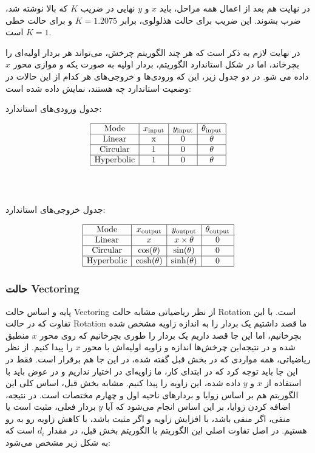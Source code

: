 \documentclass[12pt,titlepage,a4page , tikz , multi,table , svgnames,xcdraw]{article}
\begin{document}
در نهایت هم بعد از اعمال همه مراحل، باید $x$ و $y$ نهایی در ضریب $K$ که بالا نوشته شد، ضرب بشوند. این ضریب برای حالت هذلولوی، برابر $K = 1.2075$ و برای حالت خطی $K=1$ است.

در نهایت لازم به ذکر است که هر چند الگوریتم چرخش، می‌تواند هر بردار اولیه‌ای را بچرخاند، اما در شکل استاندارد الگوریتم، بردار اولیه به صورت یکه و موازی محور $x$ داده می شو. در دو جدول زیر، این که ورودی‌ها و خروجی‌های هر کدام از این حالات در وضعیت استاندارد چه هستند، نمایش داده شده است:

\begin{center}
جدول ورودی‌های استاندارد:
\end{center}
$$\begin{array}{|c|c|c|c|}
\hline \text { Mode } & x_{\text {input}} & y_{\text {input}} & \theta_{\text {input}} \\
\hline \text {Linear} & \mathrm{x} & 0 & \mathrm{\theta} \\
\hline \text {Circular} & 1 & 0 & \mathrm{\theta} \\
\hline \text {Hyperbolic} & 1 & 0 & \mathrm{\theta} \\
\hline
\end{array}$$
\\
\\
\begin{center}
جدول خروجی‌های استاندارد:
\end{center}
$$\begin{array}{|c|c|c|c|}
\hline \text { Mode } & x_{\text {output}} & y_{\text {output}} & \theta_{\text {output}} \\
\hline \text {Linear} & x & x \times \theta & 0 \\
\hline \text {Circular} & \cos (\theta) & \sin (\theta) & 0 \\
\hline \text {Hyperbolic} & \cosh (\theta) & \sinh (\theta) & 0 \\
\hline
\end{array}$$

\subsubsection{حالت Vectoring}

پایه و اساس حالت Vectoring از نظر ریاضیاتی مشابه حالت Rotation است. با این تفاوت که در حالت Rotation ما قصد داشتیم یک بردار را به اندازه زاویه مشخص شده بچرخانیم، اما این جا قصد داریم یک بردار را طوری بچرخانیم که روی محور $x$ منطبق شده و در نتیجه‌این چرخش‌ها اندازه و زاویه اولیه‌اش با محور $x$ را پیدا کنیم. از نظر ریاضیاتی، همه مواردی که در بخش قبل گفته شده، در این جا هم برقرار است. فقط در این جا باید توجه کرد که در ابتدای کار، ما زاویه‌ای در اختیار نداریم و در عوض باید با استفاده از $x$ و $y$ داده شده، این زاویه را پیدا کنیم. مشابه بخش قبل، اساس کلی این الگوریتم هم بر اساس زوایا و بردارهای ناحیه اول و چهارم مختصات است. در نتیجه، اضافه کردن زوایا، بر این اساس انجام می‌شود که آیا $y$ بردار فعلی، مثبت است یا منفی، اگر منفی باشد، با افزایش زاویه و اگر مثبت باشد، با کاهش زاویه رو به رو هستیم. در اصل تفاوت اصلی این الگوریتم با الگوریتم بخش قبل، در مقدار $d_i$ است که به شکل زیر مشخص می‌شود:
\end{document}
